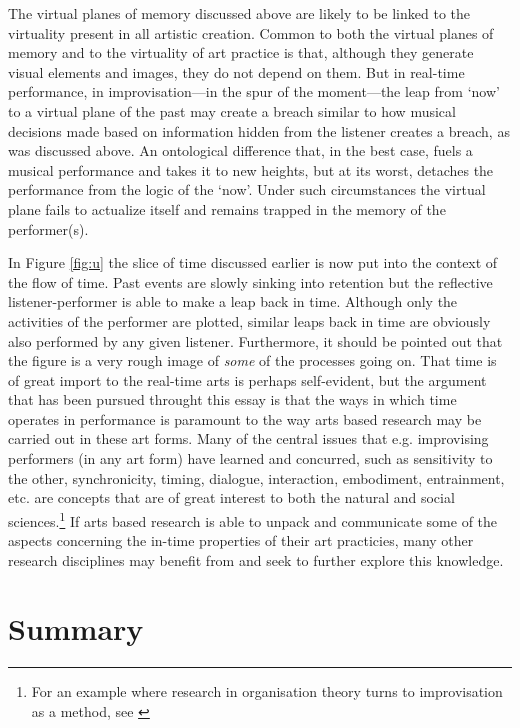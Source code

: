 The virtual planes of memory discussed above are likely to be linked to the virtuality present in all artistic creation. Common to both the virtual planes of memory and to the virtuality of art practice is that, although they generate visual elements and images, they do not depend on them.
But in real-time performance, in improvisation---in the spur of the moment---the leap from `now' to a virtual plane of the past may create a breach similar to how musical decisions made based on information hidden from the listener creates a breach, as was discussed above. An ontological difference that, in the best case, fuels a musical performance and takes it to new heights, but at its worst, detaches the performance from the logic of the `now'. Under such circumstances the virtual plane fails to actualize itself and remains trapped in the memory of the performer(s). %

In Figure \ref{fig:u} the slice of time discussed earlier is now put into the context of the flow of time. Past events are slowly sinking into retention but the reflective listener-performer is able to make a leap back in time. Although only the activities of the performer are plotted, similar leaps back in time are obviously also performed by any given listener. Furthermore, it should be pointed out that the figure is a very rough image of \emph{some} of the processes going on. That time is of great import to the real-time arts is perhaps self-evident, but the argument that has been pursued throught this essay is that the ways in which time operates in performance is paramount to the way arts based research may be carried out in these art forms. Many of the central issues that e.g. improvising performers (in any art form) have learned and concurred, such as sensitivity to the other, synchronicity, timing, dialogue, interaction, embodiment, entrainment, etc. are concepts that are of great interest to both the natural and social sciences.\footnote{For an example where research in organisation theory turns to improvisation as a method, see \parencite{lindahl03}} If arts based research is able to unpack and communicate some of the aspects concerning the in-time properties of their art practicies, many other research disciplines may benefit from and seek to further explore this knowledge.

\section{Summary}
\label{sec:summary}

